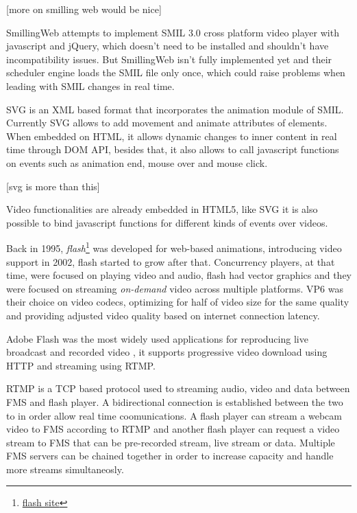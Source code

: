 {\color{red} [more on smilling web would be nice]}

  SmillingWeb \cite{smillingweb} attempts to implement \ac{SMIL} 3.0 cross platform video player with javascript and jQuery, which doesn't need to be installed and shouldn't have incompatibility issues. But SmillingWeb isn't fully implemented yet and their scheduler engine loads the \ac{SMIL} file only once, which could raise problems when leading with \ac{SMIL} changes in real time.  

  \ac{SVG} is an \ac{XML} based format that incorporates the animation module of \ac{SMIL}. Currently \ac{SVG} allows to add movement and animate attributes of elements. When embedded on \ac{HTML}, it allows dynamic changes to inner content in real time through \ac{DOM} \ac{API}, besides that, it also allows to call javascript functions on events such as animation end, mouse over and mouse click.

{\color{red} [svg is more than this]}

  Video functionalities are already embedded in \ac{HTML}5, like \ac{SVG} it is also possible to bind javascript functions for different kinds of events over videos.

  Back in 1995, \textit{flash}\footnote{\url{flash site}} was developed for web-based animations, introducing video support in 2002, flash started to grow after that. Concurrency players, at that time, were focused on playing video and audio, flash had vector graphics and they were focused on streaming \textit{on-demand} video across multiple platforms. VP6 was their choice on video codecs, optimizing for half of video size for the same quality and providing adjusted video quality based on internet connection latency. 

  Adobe Flash was the most widely used applications for reproducing live broadcast and recorded video \cite{flashvideo}, it supports progressive video download using \ac{HTTP} and streaming using \ac{RTMP}. 

  \ac{RTMP} is a \ac{TCP} based protocol used to streaming audio, video and data between \ac{FMS} and flash player. A bidirectional connection is established between the two to in order allow real time coomunications. A flash player can stream a webcam video to \ac{FMS} according to \ac{RTMP} and another flash player can request a video stream to \ac{FMS} that can be pre-recorded stream, live stream or data. Multiple \ac{FMS} servers can be chained together in order to increase capacity and handle more streams simultaneosly.

